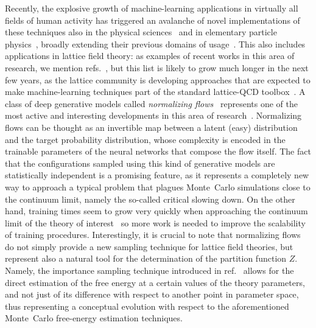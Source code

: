 \documentclass[11pt]{article}
\begin{document}
Recently, the explosive growth of machine-learning applications in virtually all fields of human activity has triggered an avalanche of novel implementations of these techniques also in the physical sciences~\cite{Carleo:2019ptp} and in elementary particle physics~\cite{Guest:2018yhq, Radovic:2018dip, Schwartz:2021ftp}, broadly extending their previous domains of usage~\cite{Denby:1987rk, Lonnblad:1990qp, Denby:1992jd, Mankel:2004yv, Aad:2014yva, Ball:2014uwa, Barnard:2016qma, Louppe:2017ipp}. This also includes applications in lattice field theory: as examples of recent works in this area of research, we mention refs.~\cite{Wetzel:2017ooo, Zhou:2018ill, Shanahan:2018vcv, Urban:2018tqv, Yoon:2018krb, Giannetti:2018vif, Matsumoto:2019jia, Chernodub:2020nip, Bluecher:2020kxq, Favoni:2020reg, Boyda:2020nfh, Medvidovic:2020vum, Bachtis:2021xoh, Gabrie:2021tlu, Singha:2021nht}, but this list is likely to grow much longer in the next few years, as the lattice community is developing approaches that are expected to make machine-learning techniques part of the standard lattice-QCD toolbox~\cite{Joo:2019byq}. A class of deep generative models called \emph{normalizing flows}~\cite{Tabak2010:deb, Kobyzev:2019nfa, Papamakarios:2021nff} represents one of the most active and interesting developments in this area of research~\cite{Albergo:2019eim, Kanwar:2020xzo, Boyda:2020hsi, Nicoli:2020njz, Albergo:2021vyo, DelDebbio:2021qwf, Hackett:2021idh, deHaan:2021erb}. Normalizing flows can be thought as an invertible map between a latent (easy) distribution and the target probability distribution, whose complexity is encoded in the trainable parameters of the neural networks that compose the flow itself. The fact that the configurations sampled using this kind of generative models are statistically independent is a promising feature, as it represents a completely new way to approach a typical problem that plagues Monte~Carlo simulations close to the continuum limit, namely the so-called critical slowing down. On the other hand, training times seem to grow very quickly when approaching the continuum limit of the theory of interest~\cite{DelDebbio:2021qwf} so more work is needed to improve the scalability of training procedures. Interestingly, it is crucial to note that normalizing flows do not simply provide a new sampling technique for lattice field theories, but represent also a natural tool for the determination of the partition function $Z$. Namely, the importance sampling technique introduced in ref.~\cite{Nicoli:2020njz} allows for the direct estimation of the free energy at a certain values of the theory parameters, and not just of its difference with respect to another point in parameter space, thus representing a conceptual evolution with respect to the aforementioned Monte~Carlo free-energy estimation techniques.
\end{document}
